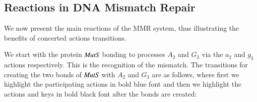\subsection{Reactions in DNA Mismatch Repair}


We now present the main reactions of the MMR system, thus illustrating the benefits of concerted actions transitions.

 We start with the protein $\mathit{MutS}$ bonding to processes $A_2$ and $G_3$  via the $a_2$ and $g_3$ actions respectively. This is the recognition of the mismatch.
The transitions for creating the two bonds of $\mathit{MutS}$ with
$A_2$ and $G_3$ are as follows, where first we highlight the participating actions in bold blue font and then we
highlight the actions and keys in bold black font after the bonds are created:

